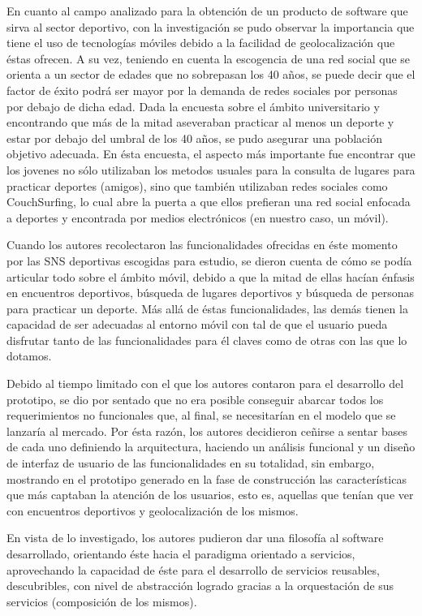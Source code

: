 En cuanto al campo analizado para la obtención de un producto de software que sirva al sector deportivo, con la investigación se pudo observar la importancia que tiene el uso de tecnologías móviles debido a la facilidad de geolocalización que éstas ofrecen. A su vez, teniendo en cuenta la escogencia de una red social que se orienta a un sector de edades que no sobrepasan los 40 años, se puede decir que el factor de éxito podrá ser mayor por la demanda de redes sociales por personas por debajo de dicha edad. Dada la encuesta sobre el ámbito universitario y encontrando que más de la mitad aseveraban practicar al menos un deporte y estar por debajo del umbral de los 40 años, se pudo asegurar una población objetivo adecuada. En ésta encuesta, el aspecto más importante fue encontrar que los jovenes no sólo utilizaban los metodos usuales para la consulta de lugares para practicar deportes (amigos), sino que también utilizaban redes sociales como CouchSurfing, lo cual abre la puerta a que ellos prefieran una red social enfocada a deportes y encontrada por medios electrónicos (en nuestro caso, un móvil).

Cuando los autores recolectaron las funcionalidades ofrecidas en éste momento por las SNS deportivas escogidas para estudio, se dieron cuenta de cómo se podía articular todo sobre el ámbito móvil, debido a que la mitad de ellas hacían énfasis en encuentros deportivos, búsqueda de lugares deportivos y búsqueda de personas para practicar un deporte. Más allá de éstas funcionalidades, las demás tienen la capacidad de ser adecuadas al entorno móvil con tal de que el usuario pueda disfrutar tanto de las funcionalidades para él claves como de otras con las que lo dotamos.

Debido al tiempo limitado con el que los autores contaron para el desarrollo del prototipo, se dio por sentado que no era posible conseguir abarcar todos los requerimientos no funcionales que, al final, se necesitarían en el modelo que se lanzaría al mercado. Por ésta razón, los autores decidieron ceñirse a sentar bases de cada uno definiendo la arquitectura, haciendo un análisis funcional y un diseño de interfaz de usuario de las funcionalidades en su totalidad, sin embargo, mostrando en el prototipo generado en la fase de construcción las características que más captaban la atención de los usuarios, esto es, aquellas que tenían que ver con encuentros deportivos y geolocalización de los mismos.

En vista de lo investigado, los autores pudieron dar una filosofía al software desarrollado, orientando éste hacia el paradigma orientado a servicios, aprovechando la capacidad de éste para el desarrollo de servicios reusables, descubribles, con nivel de abstracción logrado gracias a la orquestación de sus servicios (composición de los mismos).

